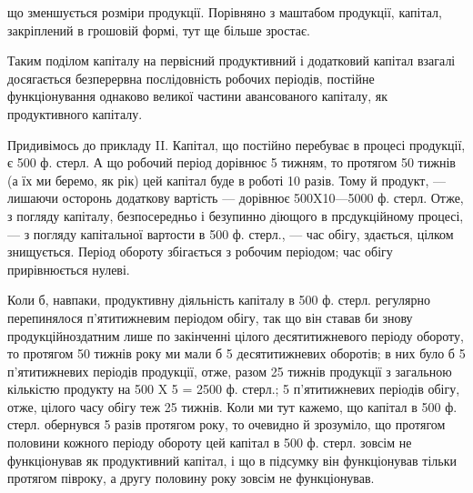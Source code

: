 \parcont{}  %
що зменшується розміри продукції. Порівняно з маштабом продукції, капітал,
закріплений в грошовій формі, тут ще більше зростає.

Таким поділом капіталу на первісний продуктивний і додатковий капітал
взагалі досягається безперервна послідовність робочих періодів, постійне
функціонування однаково великої частини авансованого капіталу,
як продуктивного капіталу.

Придивімось до прикладу II. Капітал, що постійно перебуває в процесі
продукції, є 500 ф. стерл. А що робочий період дорівнює 5 тижням,
то протягом 50 тижнів (а їх ми беремо, як рік) цей капітал буде в
роботі 10 разів. Тому й продукт, — лишаючи осторонь додаткову вартість
— дорівнює 500X10—5000 ф.  стерл. Отже, з погляду капіталу,
безпосередньо і безупинно діющого в прсдукційному процесі, — з погляду
капітальної вартости в 500 ф. стерл., — час обігу, здається, цілком
знищується. Період обороту збігається з робочим періодом; час обігу прирівнюється
нулеві.

Коли б, навпаки, продуктивну діяльність капіталу в 500 ф. стерл. регулярно
перепинялося п’ятитижневим періодом обігу, так що він ставав
би знову продукційноздатним лише по закінченні цілого десятитижневого
періоду обороту, то протягом 50 тижнів року ми мали б 5 десятитижневих
оборотів; в них було б 5 п’ятитижневих періодів продукції, отже,
разом 25 тижнів продукції з загальною кількістю продукту на 500 X 5 = 2500
ф. стерл.; 5 п’ятитижневих періодів обігу, отже, цілого часу обігу теж
25 тижнів. Коли ми тут кажемо, що капітал в 500 ф. стерл. обернувся
5 разів протягом року, то очевидно й зрозуміло, що протягом половини
кожного періоду обороту цей капітал в 500 ф. стерл. зовсім не функціонував
як продуктивний капітал, і що в підсумку він функціонував тільки
протягом півроку, а другу половину року зовсім не функціонував.

